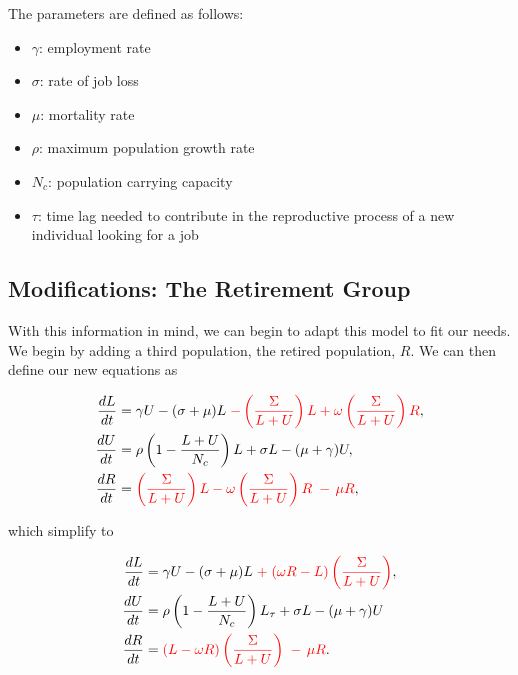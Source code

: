 \documentclass[11pt]{amsart}
\begin{document}
The parameters are defined as follows:

\begin{itemize}
    \item $\gamma$: employment rate
    \item $\sigma$: rate of job loss 
    \item $\mu$: mortality rate
    \item $\rho$: maximum population growth rate 
    \item $N_c$: population carrying capacity 
    \item $\tau$: time lag needed to contribute in the reproductive process of a new individual looking for a job
\end{itemize}

\subsection{Modifications: The Retirement Group}
 

With this information in mind, we can begin to adapt this model to fit our needs. We begin by adding a third population, the retired population, $R$.
We can then define our new equations as

\begin{align}
    \begin{split}
        \frac{dL}{dt} &= \gamma U - (\sigma + \mu)L {\color{red}\;- \left(\frac{\Sigma}{L + U}\right) L + \omega\left(\frac{\Sigma}{L + U}\right) R},\\
        \frac{dU}{dt} &= \rho\left(1 - \frac{L + U}{N_c} \right)L + \sigma L -(\mu + \gamma)U,  \\
        \frac{dR}{dt} &= {\color{red}\left(\frac{\Sigma}{L + U}\right) L - \omega\left(\frac{\Sigma}{L + U}\right) R \; - \, \mu R},
    \end{split}
\end{align}

which simplify to 

\begin{align}
    \begin{split}
        \frac{dL}{dt} &= \gamma U - (\sigma + \mu)L {\color{red}\; + \;(\omega R - L)\left(\frac{\Sigma}{L + U}\right)},\\
        \frac{dU}{dt} &= \rho\left(1 - \frac{L + U}{N_c} \right)L_{\tau} + \sigma L -(\mu + \gamma)U  \\
        \frac{dR}{dt} &= {\color{red}(L - \omega R)\left(\frac{\Sigma}{L + U}\right) \; - \, \mu R}.
    \end{split}
\end{align}
\end{document}
